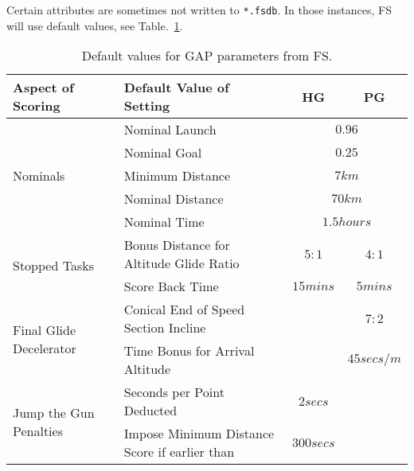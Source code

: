 \documentclass[gap.tex]{subfiles}
\begin{document}
Certain attributes are sometimes not written to \texttt{*.fsdb}. In those
instances, FS will use default values, see Table.~\ref{tab:gap-defaults}.

\begin{table}[!ht]
    \begin{tabularx}{\textwidth}{|l|X|c|c|}
    \hline
        \textbf{Aspect of Scoring}
        & \textbf{Default Value of Setting}
        & \textbf{HG}
        & \textbf{PG}
        \\
    \hline
        \multirow{5}{*}{Nominals}
        & Nominal Launch
        & \multicolumn{2}{c|}{$0.96$}
        \\
    \cline{2-4}
        & Nominal Goal
        & \multicolumn{2}{c|}{$0.25$}
        \\
    \cline{2-4}
        & Minimum Distance
        & \multicolumn{2}{c|}{$7 km$}
        \\
    \cline{2-4}
        & Nominal Distance
        & \multicolumn{2}{c|}{$70 km$}
        \\
    \cline{2-4}
        & Nominal Time
        & \multicolumn{2}{c|}{$1.5 hours$}
        \\
    \hline
        \multirow{2}{*}{Stopped Tasks}
        & Bonus Distance for Altitude Glide Ratio
        & $5:1$
        & $4:1$
        \\
    \cline{2-4}
        & Score Back Time
        & $15 mins$
        & $5 mins$
        \\
    \hline
        \multirow{2}{*}{Final Glide Decelerator}
        & Conical End of Speed Section Incline
        &
        & $7:2$
        \\
    \cline{2-4}
        & Time Bonus for Arrival Altitude
        &
        & $45 secs / m$
        \\
    \hline
        \multirow{2}{*}{Jump the Gun Penalties}
        & Seconds per Point Deducted
        & $2 secs$
        &
        \\
    \cline{2-4}
        & Impose Minimum Distance Score if earlier than
        & $300 secs$
        &
        \\
    \hline
    \end{tabularx}
    \caption{Default values for GAP parameters from FS.}
    \label{tab:gap-defaults}
\end{table}
\end{document}
